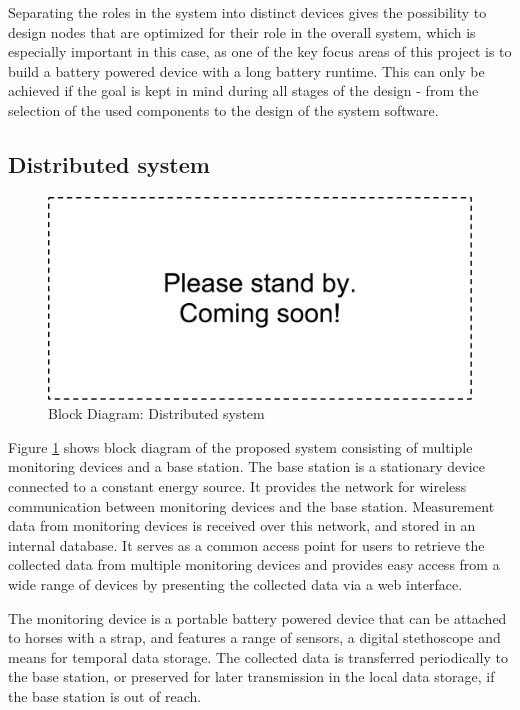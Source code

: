 Separating the roles in the system into distinct devices gives the possibility to design nodes that are optimized for their role in the overall system, which is especially important in this case, as  one of the key focus areas of this project is to build a battery powered device with a long battery runtime. This can only be achieved if the goal is kept in mind during all stages of the design - from the selection of the used components to the design of the system software.


\subsection{Distributed system}
\begin{figure}
\includegraphics[width=\textwidth]{Images/dummy}
\caption{Block Diagram: Distributed system}
\label{fig:block_system}
\end{figure}

Figure \ref{fig:block_system} shows  block diagram of the proposed system consisting of multiple monitoring devices and a base station. 
The base station is a stationary device connected to a constant energy source. It provides the network for wireless communication between monitoring devices and the base station. Measurement data from monitoring devices is received over this network, and stored in an internal database. It serves as a common access point for users to retrieve the collected data from multiple monitoring devices and provides easy access from a wide range of devices by presenting the collected data via a web interface.

The monitoring device is a portable battery powered device that can be attached to horses with a strap, and features a range of sensors, a digital stethoscope and means for temporal data storage. The collected data is transferred periodically to the base station, or preserved for later transmission in the local data storage, if the base station is out of reach.

